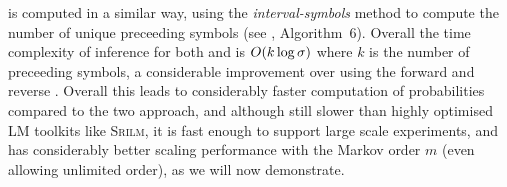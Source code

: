 \begin{algorithm}[t]
  \caption{%
$\nlplus{\dotpatdot}$, using forward \CST 
    \label{alg:n1plusfb_wt}}
\footnotesize
  \begin{algorithmic}[1]
    \Function{\nlplusfrontbacklname}{$\tf, \nf, \alpha$} 
        \If{$\depth{\tf}{\nf} > |\alpha|$}   
        \Else
            \EndFor
          \EndIf
      \State {}
    \EndFunction
  \end{algorithmic}
\end{algorithm}

\nlplusbacklname is computed in a similar way, using the \emph{interval-symbols} method to compute the number of unique preceeding symbols (see \supp, Algorithm~6).
Overall the time complexity of inference for both \nlplusbacklname and \nlplusfrontbacklname is $O(k \log \sigma)$ where $k$ is the number of preceeding symbols, a considerable improvement over \nlplusfrontbackname using the forward and reverse \CSTs.
Overall this leads to considerably faster computation of \ngram probabilities compared to the two \CST approach, and although still slower than highly optimised LM toolkits like \textsc{Srilm}, it is fast enough to support large scale experiments, and has considerably better scaling performance with the Markov order $m$ (even allowing unlimited order), as we will now demonstrate.



